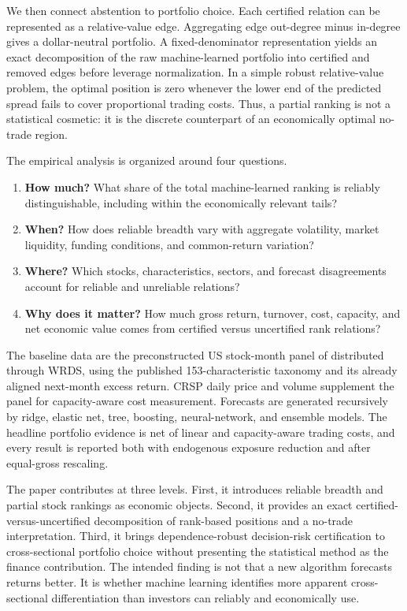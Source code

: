 We then connect abstention to portfolio choice. Each certified relation can be represented as a relative-value edge. Aggregating edge out-degree minus in-degree gives a dollar-neutral portfolio. A fixed-denominator representation yields an exact decomposition of the raw machine-learned portfolio into certified and removed edges before leverage normalization. In a simple robust relative-value problem, the optimal position is zero whenever the lower end of the predicted spread fails to cover proportional trading costs. Thus, a partial ranking is not a statistical cosmetic: it is the discrete counterpart of an economically optimal no-trade region.

The empirical analysis is organized around four questions.

\begin{enumerate}[leftmargin=2em]
\item \textbf{How much?} What share of the total machine-learned ranking is reliably distinguishable, including within the economically relevant tails?
\item \textbf{When?} How does reliable breadth vary with aggregate volatility, market liquidity, funding conditions, and common-return variation?
\item \textbf{Where?} Which stocks, characteristics, sectors, and forecast disagreements account for reliable and unreliable relations?
\item \textbf{Why does it matter?} How much gross return, turnover, cost, capacity, and net economic value comes from certified versus uncertified rank relations?
\end{enumerate}

The baseline data are the preconstructed US stock-month panel of \citet{JensenKellyPedersen2023} distributed through WRDS, using the published 153-characteristic taxonomy and its already aligned next-month excess return. CRSP daily price and volume supplement the panel for capacity-aware cost measurement. Forecasts are generated recursively by ridge, elastic net, tree, boosting, neural-network, and ensemble models. The headline portfolio evidence is net of linear and capacity-aware trading costs, and every result is reported both with endogenous exposure reduction and after equal-gross rescaling.

The paper contributes at three levels. First, it introduces reliable breadth and partial stock rankings as economic objects. Second, it provides an exact certified-versus-uncertified decomposition of rank-based positions and a no-trade interpretation. Third, it brings dependence-robust decision-risk certification to cross-sectional portfolio choice without presenting the statistical method as the finance contribution. The intended finding is not that a new algorithm forecasts returns better. It is whether machine learning identifies more apparent cross-sectional differentiation than investors can reliably and economically use.
